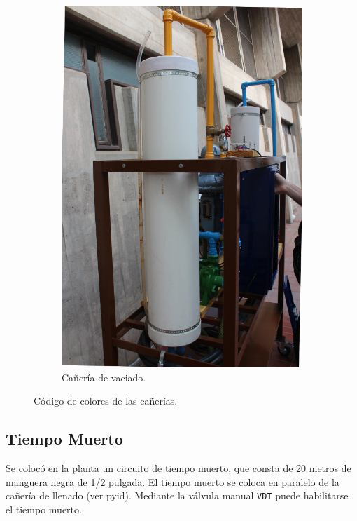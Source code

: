\begin{figure}[ht]
\begin{subfigure}[b]{0.36\textwidth}
\includegraphics[width=\textwidth]{Cap2-DisenoEnsamblado/images/caneria2.JPG}
	\caption{Cañería de vaciado.}
        \end{subfigure}
        \caption{Código de colores de las cañerías.}
        \label{fig:canerias}
\end{figure}

\subsection{Tiempo Muerto}
\label{subsec:tiempoMuerto}
Se colocó en la planta un circuito de tiempo muerto, que consta de 20 metros de
manguera negra de 1/2 pulgada.
El tiempo muerto se coloca en paralelo de la cañería de llenado (ver
\gls{pyid}).
Mediante la válvula manual \verb|VDT| puede habilitarse el tiempo muerto.

